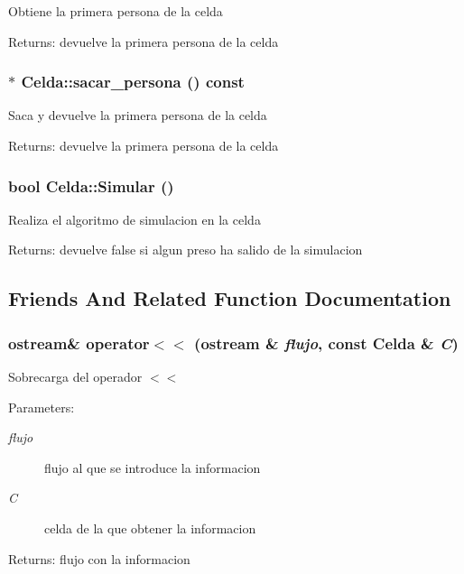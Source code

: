 Obtiene la primera persona de la celda \begin{Desc}
\item[Returns:]devuelve la primera persona de la celda \end{Desc}
\subsubsection{ $\ast$ Celda::sacar\_\-persona () const}\label{classCelda_bfbb71f6ee86a38a31ed962b8e9d1e7f}


Saca y devuelve la primera persona de la celda \begin{Desc}
\item[Returns:]devuelve la primera persona de la celda \end{Desc}
\subsubsection{\setlength{\rightskip}{0pt plus 5cm}bool Celda::Simular ()}\label{classCelda_bc75b59cd9ee8a0bc7c115c847a0a141}


Realiza el algoritmo de simulacion en la celda \begin{Desc}
\item[Returns:]devuelve false si algun preso ha salido de la simulacion \end{Desc}


\subsection{Friends And Related Function Documentation}
\subsubsection{\setlength{\rightskip}{0pt plus 5cm}ostream\& operator$<$$<$ (ostream \& {\em flujo}, const {\bf Celda} \& {\em C})\hspace{0.3cm}{\tt  [friend]}}\label{classCelda_1ae028893035e539215673ec05256b71}


Sobrecarga del operador $<$$<$ \begin{Desc}
\item[Parameters:]
\begin{description}
\item[{\em flujo}]flujo al que se introduce la informacion \item[{\em C}]celda de la que obtener la informacion \end{description}
\end{Desc}
\begin{Desc}
\item[Returns:]flujo con la informacion \end{Desc}


